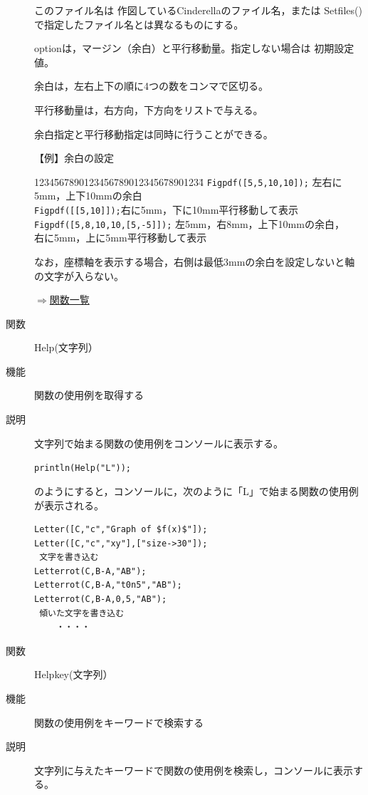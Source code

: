 \documentclass[papersize,a4paper,10pt,uplatex]{jsarticle}
\begin{document}
\begin{description}
このファイル名は 作図しているCinderellaのファイル名，または Setfiles() で指定したファイル名とは異なるものにする。

optionは，マージン（余白）と平行移動量。指定しない場合は 初期設定値。

余白は，左右上下の順に4つの数をコンマで区切る。

平行移動量は，右方向，下方向をリストで与える。

余白指定と平行移動指定は同時に行うことができる。

\vspace{\baselineskip}
【例】余白の設定
\begin{tabbing}
1234\=567890123456789012345678901234\=\kill
 \> \verb|Figpdf([5,5,10,10]);|\> 左右に5mm，上下10mmの余白\\
 \> \verb|Figpdf([[5,10]]);|\>右に5mm，下に10mm平行移動して表示\\
 \> \verb|Figpdf([5,8,10,10,[5,-5]]);| \> 左5mm，右8mm，上下10mmの余白，\\
\>\> 右に5mm，上に5mm平行移動して表示
\end{tabbing}

なお，座標軸を表示する場合，右側は最低3mmの余白を設定しないと軸の文字が入らない。

\begin{flushright}\hyperlink{functionlist}{$\Rightarrow$関数一覧}\end{flushright}

\vspace{\baselineskip}
\hypertarget{help}{}
\item[関数]Help(文字列）
\item[機能]関数の使用例を取得する
\item[説明]文字列で始まる関数の使用例をコンソールに表示する。

\hspace{10mm} \verb|println(Help("L"));|

のようにすると，コンソールに，次のように「L」で始まる関数の使用例が表示される。
\begin{verbatim}
Letter([C,"c","Graph of $f(x)$"]); 
Letter([C,"c","xy"],["size->30"]); 
 文字を書き込む 
Letterrot(C,B-A,"AB"); 
Letterrot(C,B-A,"t0n5","AB"); 
Letterrot(C,B-A,0,5,"AB"); 
 傾いた文字を書き込む 
 　　・・・・
\end{verbatim}

\vspace{\baselineskip}
\hypertarget{helpkey}{}
\item[関数]Helpkey(文字列）
\item[機能]関数の使用例をキーワードで検索する
\item[説明]文字列に与えたキーワードで関数の使用例を検索し，コンソールに表示する。


\end{description}
\end{document}
